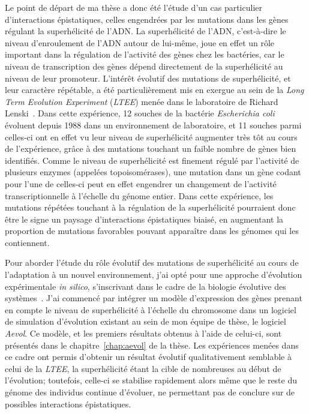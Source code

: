 Le point de départ de ma thèse a donc été l'étude d'un cas particulier d'interactions épistatiques, celles engendrées par les mutations dans les gènes régulant la superhélicité de l'ADN.
La superhélicité de l'ADN, c'est-à-dire le niveau d'enroulement de l'ADN autour de lui-même, joue en effet un rôle important dans la régulation de l'activité des gènes chez les bactéries, car le niveau de transcription des gènes dépend directement de la superhélicité au niveau de leur promoteur.
L'intérêt évolutif des mutations de superhélicité, et leur caractère répétable, a été particulièrement mis en exergue au sein de la \emph{Long Term Evolution Experiment} (\emph{LTEE}) menée dans le laboratoire de Richard Lenski~\citep{lenski1991}.
Dans cette expérience, 12 souches de la bactérie \emph{Escherichia coli} évoluent depuis 1988 dans un environnement de laboratoire, et 11 souches parmi celles-ci ont en effet vu leur niveau de superhélicité augmenter très tôt au cours de l'expérience, grâce à des mutations touchant un faible nombre de gènes bien identifiés.
Comme le niveau de superhélicité est finement régulé par l'activité de plusieurs enzymes (appelées topoisomérases), une mutation dans un gène codant pour l'une de celles-ci peut en effet engendrer un changement de l'activité transcriptionnelle à l'échelle du génome entier.
Dans cette expérience, les mutations répétées touchant à la régulation de la superhélicité pourraient donc être le signe un paysage d'interactions épistatiques biaisé, en augmentant la proportion de mutations favorables pouvant apparaître dans les génomes qui les contiennent.

Pour aborder l'étude du rôle évolutif des mutations de superhélicité au cours de l'adaptation à un nouvel environnement, j'ai opté pour une approche d'évolution expérimentale \emph{in silico}, s'inscrivant dans le cadre de la biologie évolutive des systèmes~\citep{beslon2021}.
J'ai commencé par intégrer un modèle d'expression des gènes prenant en compte le niveau de superhélicité à l'échelle du chromosome dans un logiciel de simulation d'évolution existant au sein de mon équipe de thèse, le logiciel \emph{Aevol}.
Ce modèle, et les premiers résultats obtenus à l'aide de celui-ci, sont présentés dans le chapitre~\ref{chap:aevol} de la thèse.
Les expériences menées dans ce cadre ont permis d'obtenir un résultat évolutif qualitativement semblable à celui de la \emph{LTEE}, la superhélicité étant la cible de nombreuses au début de l'évolution; toutefois, celle-ci se stabilise rapidement alors même que le reste du génome des individus continue d'évoluer, ne permettant pas de conclure sur de possibles interactions épistatiques.

